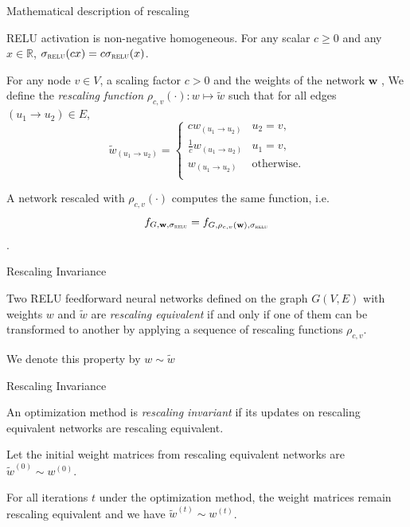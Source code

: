 \documentclass[presentation,xcolor={usenames,dvipsnames},10pt]{beamer}
\newcommand{\relu}{\sigma_{\textsc{relu}}}
\begin{document}
\begin{frame}{Mathematical description of rescaling}
\begin{lemma}
RELU activation is non-negative homogeneous. For any scalar $c \geq 0$ and any $x \in \mathbb{R}$, $\relu(cx) = c\relu(x)$. 
\end{lemma}

\begin{definition}
For any node $v \in V$, a scaling factor $c > 0$ and the weights of the network $\mathbf{w}$ , We define the {\em rescaling function} $\rho_{c,v}(\cdot) : w \mapsto \tilde{w}$ such that for all edges $(u_1\rightarrow u_2)\in E$,
\begin{equation}
\tilde{w}_{(u_1\rightarrow u_2)}=
\begin{cases}
cw_{(u_1\rightarrow u_2)}& u_2=v,\\
\frac{1}{c}w_{(u_1\rightarrow u_2)}& u_1=v,\\
w_{(u_1\rightarrow u_2)}& \text{otherwise.}\\
\end{cases}
\end{equation}
\end{definition}

A network rescaled with $\rho_{c,v}(\cdot)$ computes the same function, i.e. 
$$f_{G,\mathbf{w},\relu} = f_{G,\rho_{c,v}(\mathbf{w}),\relu}$$.

\end{frame}

\begin{frame}{Rescaling Invariance}
\begin{definition}
Two RELU feedforward neural networks defined on the graph $G(V,E)$ with weights $w$ and $\tilde{w}$ are {\em rescaling equivalent} if and only if one of them can be transformed to another by applying a sequence of rescaling functions $\rho_{c,v}$.
	
We denote this property by $w\sim \tilde{w}$
\end{definition}
\end{frame}

\begin{frame}{Rescaling Invariance}
\begin{definition}
An optimization method is {\em rescaling invariant} if its updates on rescaling equivalent networks are rescaling equivalent.

Let the initial weight matrices from rescaling equivalent  networks are $\tilde{w}^{(0)}\sim w^{(0)}$. 

For all iterations $t$ under the optimization method, the weight matrices remain rescaling equivalent and we have $\tilde{w}^{(t)} \sim
w^{(t)}$.	
\end{definition}
\end{frame}
\end{document}
